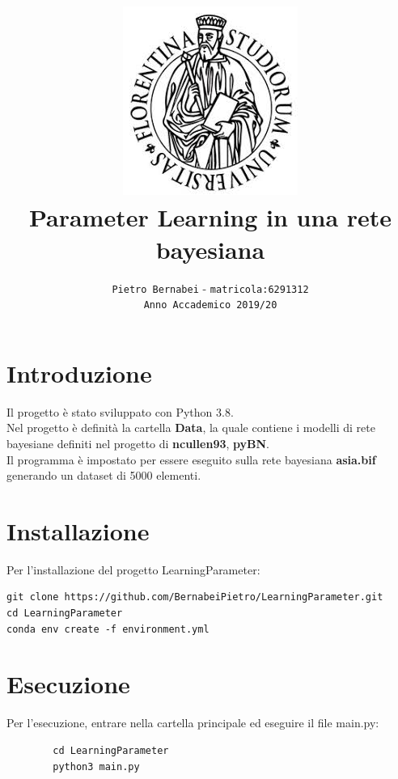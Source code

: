 \documentclass[14pt]{extarticle}
\begin{document}
\title{\includegraphics{download.jpeg} \vspace{2cm} \textbf{\\Parameter Learning in una rete bayesiana}}

\author{\texttt{Pietro Bernabei} - \texttt{matricola:6291312}\\ \texttt{Anno Accademico 2019/20}}
\date{}
\maketitle

\newpage
\section{Introduzione}
	Il progetto è stato sviluppato con Python 3.8.\\
	Nel  progetto è definità la cartella \textbf{Data}, la quale contiene  i modelli di rete bayesiane definiti nel progetto di \textbf{ncullen93}, \textbf{pyBN}. \\
	Il programma è impostato per essere eseguito sulla rete bayesiana \textbf{asia.bif} generando un dataset di 5000 elementi.
	\section{Installazione}	
Per l'installazione del progetto LearningParameter:
\begin{lstlisting}
git clone https://github.com/BernabeiPietro/LearningParameter.git
cd LearningParameter
conda env create -f environment.yml
\end{lstlisting} 
	
	 \section{Esecuzione}
Per l'esecuzione, entrare nella cartella principale ed eseguire il file main.py:
		\begin{lstlisting}
		cd LearningParameter
		python3 main.py
		\end{lstlisting}
		
\end{document}
